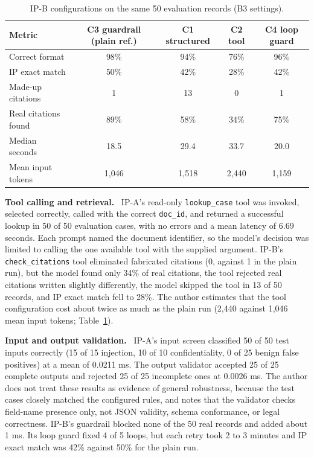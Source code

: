 \documentclass[10pt,letterpaper]{article}
\newcommand{\para}[1]{\textbf{#1}\ }
\newcommand{\code}[1]{\texttt{\small #1}}
\begin{document}
\begin{table}[ht]
\centering\footnotesize
\caption{IP-B configurations on the same 50 evaluation records (B3 settings).}\label{tab:ipb}
\begin{tabular}{@{}lcccc@{}}
\toprule
\textbf{Metric} & \textbf{C3 guardrail (plain ref.)} & \textbf{C1 structured} & \textbf{C2 tool} & \textbf{C4 loop guard}\\
\midrule
Correct format & 98\% & 94\% & 76\% & 96\%\\
IP exact match & 50\% & 42\% & 28\% & 42\%\\
Made-up citations & 1 & 13 & 0 & 1\\
Real citations found & 89\% & 58\% & 34\% & 75\%\\
Median seconds & 18.5 & 29.4 & 33.7 & 20.0\\
Mean input tokens & 1,046 & 1,518 & 2,440 & 1,159\\
\bottomrule
\end{tabular}
\end{table}

\para{Tool calling and retrieval.} IP-A's read-only \code{lookup\_case} tool was invoked, selected correctly, called with the correct \code{doc\_id}, and returned a successful lookup in 50 of 50 evaluation cases, with no errors and a mean latency of 6.69 seconds. Each prompt named the document identifier, so the model's decision was limited to calling the one available tool with the supplied argument. IP-B's \code{check\_citations} tool eliminated fabricated citations (0, against 1 in the plain run), but the model found only 34\% of real citations, the tool rejected real citations written slightly differently, the model skipped the tool in 13 of 50 records, and IP exact match fell to 28\%. The author estimates that the tool configuration cost about twice as much as the plain run (2,440 against 1,046 mean input tokens; Table~\ref{tab:ipb}).

\para{Input and output validation.} IP-A's input screen classified 50 of 50 test inputs correctly (15 of 15 injection, 10 of 10 confidentiality, 0 of 25 benign false positives) at a mean of 0.0211 ms. The output validator accepted 25 of 25 complete outputs and rejected 25 of 25 incomplete ones at 0.0026 ms. The author does not treat these results as evidence of general robustness, because the test cases closely matched the configured rules, and notes that the validator checks field-name presence only, not JSON validity, schema conformance, or legal correctness. IP-B's guardrail blocked none of the 50 real records and added about 1 ms. Its loop guard fixed 4 of 5 loops, but each retry took 2 to 3 minutes and IP exact match was 42\% against 50\% for the plain run.
\end{document}
